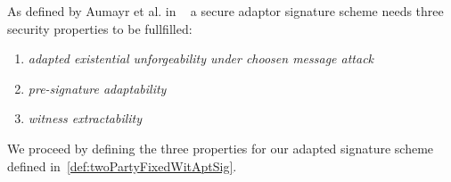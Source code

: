 \begin{definition}
    As defined by Aumayr et al. in ~\cite{aumayr2020bitcoinchannels} a secure adaptor signature scheme needs three security properties to be fullfilled:
    \begin{enumerate}
        \item \textit{adapted existential unforgeability under choosen message attack}
        \item \textit{pre-signature adaptability}
        \item \textit{witness extractability}
    \end{enumerate}
\end{definition}

We proceed by defining the three properties for our adapted signature scheme defined in~\ref{def:twoPartyFixedWitAptSig}.


